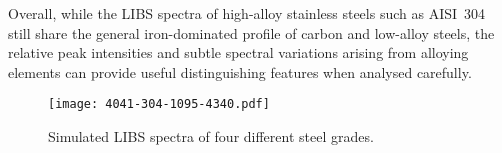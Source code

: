 \documentclass[12pt,a4paper]{article}
\begin{document}
   
 	
 	Overall, while the LIBS spectra of high-alloy stainless steels such as AISI~304 still share the general iron-dominated profile of carbon and low-alloy steels, the relative peak intensities and subtle spectral variations arising from alloying elements can provide useful distinguishing features when analysed carefully.
 	
	
	\begin{figure}[h!]
		\centering
		\texttt{[image: 4041-304-1095-4340.pdf]}
		\caption{Simulated LIBS spectra of four different steel grades.}
		\label{fig:4041-304-1095-4340}
	\end{figure} 
	
%	
%	
%	
	
\end{document}
